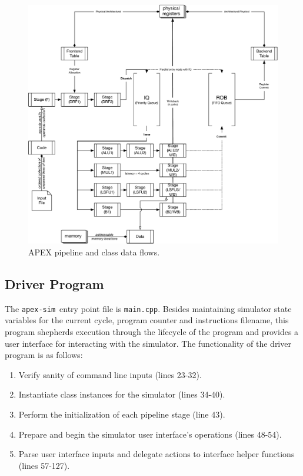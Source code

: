 \documentclass[12pt]{article}
\newcommand{\codename}[0]{\texttt{apex-sim}~}
\begin{document}
\begin{figure}
  \includegraphics[width=\linewidth]{./figs/apex-sim-overview-2.pdf}
  \caption{APEX pipeline and class data flows.}
  \label{fig:overview}
\end{figure}

\subsection{Driver Program}
\label{sec:driver}
The \codename entry point file is \texttt{main.cpp}. Besides maintaining simulator state variables for the current cycle, program counter and instructions filename, this program shepherds execution through the lifecycle of the program and provides a user interface for interacting with the simulator. The functionality of the driver program is as follows:
\begin{enumerate}
  \item Verify sanity of command line inputs (lines 23-32).
  \item Instantiate class instances for the simulator (lines 34-40).
  \item Perform the initialization of each pipeline stage (line 43).
  \item Prepare and begin the simulator user interface's operations (lines 48-54).
  \item Parse user interface inputs and delegate actions to interface helper functions (lines 57-127).
\end{enumerate}
\end{document}
